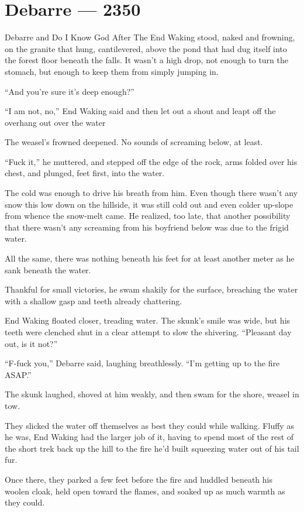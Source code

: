 \hypertarget{debarre-2350}{%
\chapter{Debarre — 2350}\label{debarre-2350}}

Debarre and Do I Know God After The End Waking stood, naked and frowning, on the granite that hung, cantilevered, above the pond that had dug itself into the forest floor beneath the falls. It wasn't a high drop, not enough to turn the stomach, but enough to keep them from simply jumping in.

``And you're sure it's deep enough?''

``I am not, no,'' End Waking said and then let out a shout and leapt off the overhang out over the water

The weasel's frowned deepened. No sounds of screaming below, at least.

``Fuck it,'' he muttered, and stepped off the edge of the rock, arms folded over his chest, and plunged, feet first, into the water.

The cold was enough to drive his breath from him. Even though there wasn't any snow this low down on the hillside, it was still cold out and even colder up-slope from whence the snow-melt came. He realized, too late, that another possibility that there wasn't any screaming from his boyfriend below was due to the frigid water.

All the same, there was nothing beneath his feet for at least another meter as he sank beneath the water.

Thankful for small victories, he swam shakily for the surface, breaching the water with a shallow gasp and teeth already chattering.

End Waking floated closer, treading water. The skunk's smile was wide, but his teeth were clenched shut in a clear attempt to slow the shivering. ``Pleasant day out, is it not?''

``F-fuck you,'' Debarre said, laughing breathlessly. ``I'm getting up to the fire ASAP.''

The skunk laughed, shoved at him weakly, and then swam for the shore, weasel in tow.

They slicked the water off themselves as best they could while walking. Fluffy as he was, End Waking had the larger job of it, having to spend most of the rest of the short trek back up the hill to the fire he'd built squeezing water out of his tail fur.

Once there, they parked a few feet before the fire and huddled beneath his woolen cloak, held open toward the flames, and soaked up as much warmth as they could.

